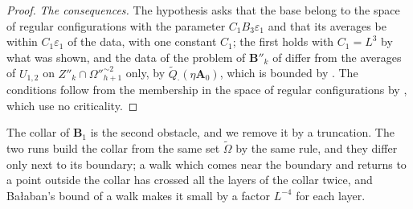 \begin{proof}
\emph{The consequences.} The hypothesis \cite[(14)]{BalabanVAR} asks that the base belong to the space of regular configurations with the parameter $C_1B_3\varepsilon_1$ and that its averages be within $C_1\varepsilon_1$ of the data, with one constant $C_1$; the first holds with $C_1 = L^3$ by what was shown, and the data of the problem of $\mathbf B''_k$ of \cite[(1.54)]{BalabanLFR2} differ from the averages of $U_{1,2}$ on $Z''_k \cap \Omega''^{\sim2}_{h+1}$ only, by $\tilde Q_\cdot(\eta\mathbf A_0)$, which is bounded by \cite[(1.87), p.~197]{BalabanLFR1}. The conditions \cite[(3.35), (3.36)]{BalabanPBG} follow from the membership in the space of regular configurations by \cite[Sect.~F and Proposition~6, pp.~97--99]{BalabanREG}, which use no criticality.
\end{proof}

The collar of $\mathbf B_1$ is the second obstacle, and we remove it by a truncation. The two runs build the collar from the same set $\tilde\Omega$ by the same rule, and they differ only next to its boundary; a walk which comes near the boundary and returns to a point outside the collar has crossed all the layers of the collar twice, and Ba{\l}aban's bound of a walk makes it small by a factor $L^{-4}$ for each layer.

